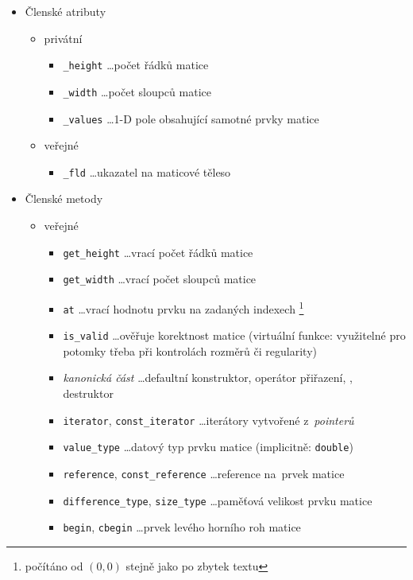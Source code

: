\documentclass[11pt,a4paper]{article}
\begin{document}
\begin{itemize}
  \item Členské atributy
  \begin{itemize}
    \item privátní
    \begin{itemize}
      \item \verb=_height= \ldots počet řádků matice
      \item \verb=_width= \ldots počet sloupců matice
      \item \verb=_values= \ldots 1-D pole obsahující samotné prvky matice
    \end{itemize}
    \item veřejné
    \begin{itemize}
      \item \verb=_fld= \ldots ukazatel na maticové těleso
    \end{itemize}
  \end{itemize}
  \item Členské metody
  \begin{itemize}
    \item veřejné
    \begin{itemize}
      \item \verb=get_height= \ldots vrací počet řádků matice
      \item \verb=get_width= \ldots vrací počet sloupců matice
      \item \verb=at= \ldots vrací hodnotu prvku na zadaných
        indexech\thinspace%
        \footnote{počítáno od $(0,0)$ stejně jako po zbytek textu}
      \item \verb=is_valid= \ldots ověřuje korektnost matice (virtuální funkce:
        vy\-u\-ži\-tel\-né pro potomky třeba při kontrolách rozměrů či
        regularity)
      \item \emph{kanonická část\/} \ldots defaultní konstruktor, operátor
        přiřazení, , destruktor
      \item \verb=iterator=, \verb=const_iterator= \ldots iterátory vytvořené
        z~\emph{pointerů\/}
      \item \verb=value_type= \ldots datový typ prvku matice (implicitně:
        \verb=double=)
      \item \verb=reference=, \verb=const_reference= \ldots reference na~prvek
        matice
      \item \verb=difference_type=, \verb=size_type= \ldots paměťová velikost
        prvku matice
      \item \verb=begin=, \verb=cbegin= \ldots prvek levého horního roh matice

\end{itemize}
\end{itemize}
\end{itemize}
\end{document}
